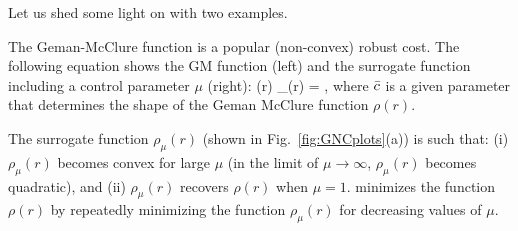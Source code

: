  Let us shed some light on \GNC with two examples.
 \setcounter{theorem}{0}
  \begin{example} 
  \label{example:GM}
  The Geman-McClure function is a popular (non-convex) robust cost. 
  The following equation shows the GM function (left) and the surrogate function  including 
  a control parameter $\mu$ (right):
  \bea \label{eq:formulationGNCGM}
\rho(r) \doteq {}
  \;\; \Longrightarrow \;\;
 \rho_{\mu}(r) = ,
\eea
where $\bar{c}$ is a given parameter that 
 determines the shape of the Geman McClure function $\rho(r)$. %

The surrogate function $\rho_{\mu}(r)$ (shown in Fig.~\ref{fig:GNCplots}(a)) is such that: (i)  $\rho_{\mu}(r)$ becomes convex for large $\mu$ (in the limit of $\mu \rightarrow \infty$, $\rho_{\mu}(r)$ becomes quadratic), and (ii) $\rho_{\mu}(r)$ recovers $\rho(r)$  when $\mu = 1$. 
\GNC minimizes the function $\rho(r)$ by repeatedly minimizing the function $\rho_{\mu}(r)$ for decreasing values of $\mu$. %
\end{example}


